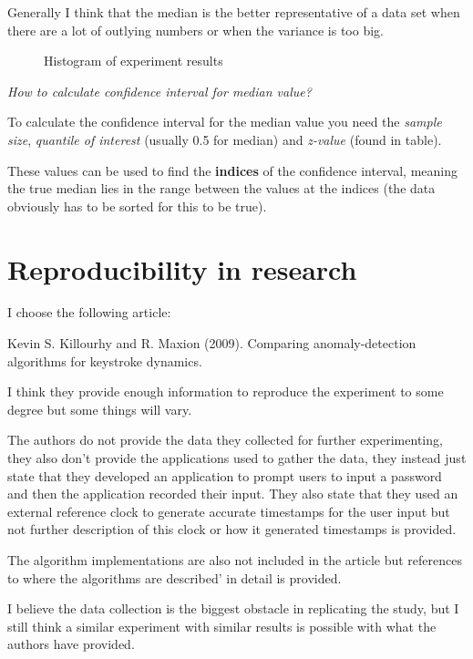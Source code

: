 \documentclass[11pt, a4paper]{article}
\begin{document}
Generally I think that the median is the better representative of a data set when there are a lot of
outlying numbers or when the variance is too big.  

\begin{figure}[h]
	\label{fig:plot3}
	\centering
	\caption{Histogram of experiment results}
	
\end{figure}

\vspace{4mm}\noindent
\textit{How to calculate confidence interval for median value?}

\vspace{2mm}\noindent
To calculate the confidence interval for the median value you need the \textit{sample size}, \textit{quantile of interest}
(usually 0.5 for median) and \textit{z-value} (found in table). 

These values can be used to find the \textbf{indices} of the confidence interval, meaning the true median
lies in the range between the values at the indices (the data obviously has to be sorted for this to be true).

\section{Reproducibility in research}
I choose the following article: 

Kevin S. Killourhy and R. Maxion (2009). Comparing anomaly-detection
algorithms for keystroke dynamics.

\vspace{2mm}\noindent
I think they provide enough information to reproduce the experiment to some degree but some things will vary.

The authors do not provide the data they collected for further experimenting, they also don't provide the applications
used to gather the data, they instead just state that they developed an application to prompt users to input a password
and then the application recorded their input. They also state that they used an external reference clock to generate 
accurate timestamps for the user input but not further description of this clock or how it generated timestamps is provided.

The algorithm implementations are also not included in the article but references to where the algorithms are described'
in detail is provided.

I believe the data collection is the biggest obstacle in replicating the study, but I still think a similar experiment with
similar results is possible with what the authors have provided.
\end{document}
